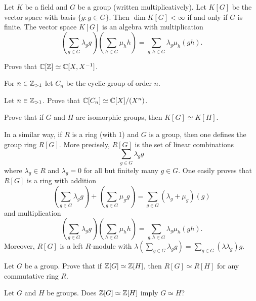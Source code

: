 \chapter{}


Let $K$ be a field and $G$ be a group (written multiplicatively). Let $K[G]$ be the 
vector space with basis $\{g:g\in G\}$. Then $\dim K[G]<\infty$ if and only if $G$ 
is finite. The vector space $K[G]$ is an algebra
with multiplication
\[
\left(\sum_{g\in G}\lambda_gg\right)\left(\sum_{h\in G}\mu_hh\right)
=\sum_{g,h\in G}\lambda_g\mu_h(gh).
\]

\begin{exercise}
    Prove that $\mathbb{C}[\mathbb{Z}]\simeq\mathbb{C}[X,X^{-1}]$. 
\end{exercise}

For $n\in\mathbb{Z}_{>1}$
let $C_n$ be the cyclic group of order $n$.
    
\begin{exercise}
    Let $n\in\mathbb{Z}_{>1}$. Prove that $\mathbb{C}[C_n]\simeq\mathbb{C}[X]/(X^n)$. 
\end{exercise}

\begin{exercise}
    Prove that if $G$ and $H$ are isomorphic groups, then $K[G]\simeq K[H]$. 
\end{exercise}

In a similar way, if $R$ is a ring (with 1) 
and $G$ is a group, then one defines the group ring $R[G]$. More precisely,
$R[G]$ is the set of linear combinations
\[
    \sum_{g\in G}\lambda_gg
\]
where $\lambda_g\in R$ and $\lambda_g=0$ for all but finitely many $g\in G$. 
One easily proves that $R[G]$ is a ring with 
addition
\[
\left(\sum_{g\in G}\lambda_gg\right)+\left(\sum_{g\in G}\mu_gg\right)
=\sum_{g\in G}(\lambda_g+\mu_g)(g)
\]
and multiplication 
\[
\left(\sum_{g\in G}\lambda_gg\right)\left(\sum_{h\in G}\mu_hh\right)
=\sum_{g,h\in G}\lambda_g\mu_h(gh).
\]
Moreover, $R[G]$ is a left $R$-module with
$\lambda(\sum_{g\in G}\lambda_gg)=\sum_{g\in G}(\lambda\lambda_g)g$. 

\begin{exercise}
    Let $G$ be a group. Prove that if 
    $\mathbb{Z}[G]\simeq\mathbb{Z}[H]$, then $R[G]\simeq R[H]$ for any commutative ring $R$.      
\end{exercise}

\begin{question}
\label{question:IP}
    Let $G$ and $H$ be groups. Does $\mathbb{Z}[G]\simeq\mathbb{Z}[H]$ imply $G\simeq H$?
\end{question}   

